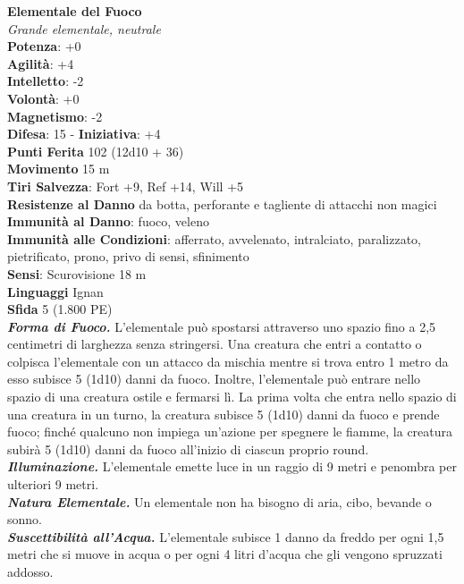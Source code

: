 \begin{multicols}{2}
\medskip\textbf{Elementale del Fuoco}\\
\emph{Grande elementale, neutrale}\\
\textbf{Potenza}: +0\\
\textbf{Agilità}: +4\\
\textbf{Intelletto}: -2\\
\textbf{Volontà}: +0\\
\textbf{Magnetismo}: -2\\
\textbf{Difesa}: 15 - \textbf{Iniziativa}: +4\\
\textbf{Punti Ferita} 102 (12d10 + 36)\\
\textbf{Movimento} 15 m\\
\textbf{Tiri Salvezza}: Fort +9, Ref +14, Will +5\\
\textbf{Resistenze al Danno} da botta, perforante e tagliente di attacchi non magici\\
\textbf{Immunità al Danno}: fuoco, veleno\\
\textbf{Immunità alle Condizioni}: afferrato, avvelenato, intralciato, paralizzato, pietrificato, prono, privo di sensi, sfinimento \\
\textbf{Sensi}: Scurovisione 18 m\\
\textbf{Linguaggi} Ignan\\
\textbf{Sfida} 5 (1.800 PE)\smallskip\\
\emph{\textbf{Forma di Fuoco.}} L'elementale può spostarsi attraverso uno spazio fino a 2,5 centimetri di larghezza senza stringersi. Una creatura che entri a contatto o colpisca l'elementale con un attacco da mischia mentre si trova entro 1 metro da esso subisce 5 (1d10) danni da fuoco. Inoltre, l'elementale può entrare nello spazio di una creatura ostile e fermarsi lì. La prima volta che entra nello spazio di una creatura in un turno, la creatura subisce 5 (1d10) danni da fuoco e prende fuoco; finché qualcuno non impiega un'azione per spegnere le fiamme, la creatura subirà 5 (1d10) danni da fuoco all'inizio di ciascun proprio round.\\
\emph{\textbf{Illuminazione.}} L'elementale emette luce in un raggio di 9 metri e penombra per ulteriori 9 metri.\\
\emph{\textbf{Natura Elementale.}} Un elementale non ha bisogno di aria, cibo, bevande o sonno.\\
\emph{\textbf{Suscettibilità all'Acqua.}} L'elementale subisce 1 danno da freddo per ogni 1,5 metri che si muove in acqua o per ogni 4 litri d'acqua che gli vengono spruzzati addosso.\\

\end{multicols}
